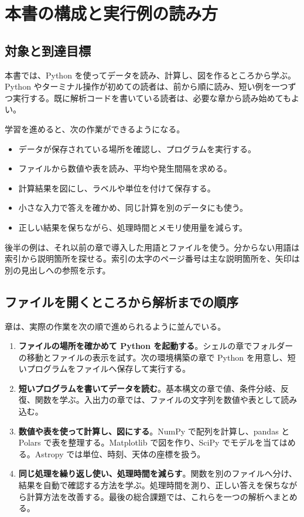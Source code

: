 \chapter{本書の構成と実行例の読み方}
\label{chap:usage}

\section{対象と到達目標}

本書では、Python を使ってデータを読み、計算し、図を作るところから学ぶ。Python やターミナル操作が初めての読者は、前から順に読み、短い例を一つずつ実行する。既に解析コードを書いている読者は、必要な章から読み始めてもよい。

学習を進めると、次の作業ができるようになる。
\begin{itemize}
\item データが保存されている場所を確認し、プログラムを実行する。
\item ファイルから数値や表を読み、平均や発生間隔を求める。
\item 計算結果を図にし、ラベルや単位を付けて保存する。
\item 小さな入力で答えを確かめ、同じ計算を別のデータにも使う。
\item 正しい結果を保ちながら、処理時間とメモリ使用量を減らす。
\end{itemize}

後半の例は、それ以前の章で導入した用語とファイルを使う。分からない用語は索引から説明箇所を探せる。索引の太字のページ番号は主な説明箇所を、矢印は別の見出しへの参照を示す。

\section{ファイルを開くところから解析までの順序}

章は、実際の作業を次の順で進められるように並んでいる。

\begin{enumerate}
\item \textbf{ファイルの場所を確かめて Python を起動する}。シェルの章でフォルダーの移動とファイルの表示を試す。次の環境構築の章で Python を用意し、短いプログラムをファイルへ保存して実行する。
\item \textbf{短いプログラムを書いてデータを読む}。基本構文の章で値、条件分岐、反復、関数を学ぶ。入出力の章では、ファイルの文字列を数値や表として読み込む。
\item \textbf{数値や表を使って計算し、図にする}。NumPy で配列を計算し、pandas と Polars で表を整理する。Matplotlib で図を作り、SciPy でモデルを当てはめる。Astropy では単位、時刻、天体の座標を扱う。
\item \textbf{同じ処理を繰り返し使い、処理時間を減らす}。関数を別のファイルへ分け、結果を自動で確認する方法を学ぶ。処理時間を測り、正しい答えを保ちながら計算方法を改善する。最後の総合課題では、これらを一つの解析へまとめる。
\end{enumerate}

